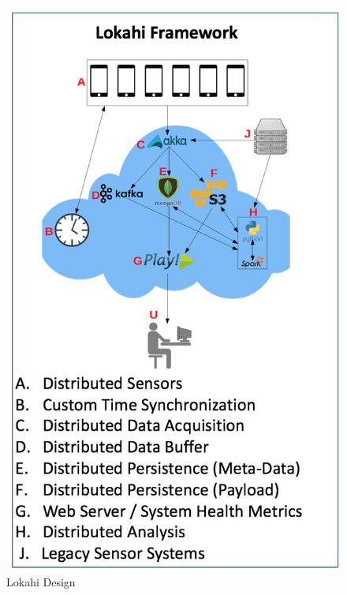 \begin{figure}
	\centering
	\includegraphics[]{figures/lokahi.png}
	\caption{Lokahi Design}\label{fig:lokahi}
\end{figure}

